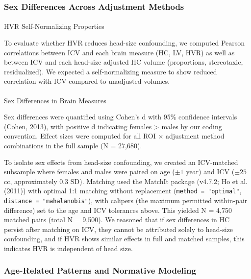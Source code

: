 \documentclass[
]{article}
\makeatletter
\let\oldparagraph\paragraph
\renewcommand{\paragraph}{
    \@ifstar
      \xxxParagraphStar
      \xxxParagraphNoStar
  }
\newcommand{\xxxParagraphStar}[1]{\oldparagraph*{#1}\mbox{}}
\newcommand{\xxxParagraphNoStar}[1]{\oldparagraph{#1}\mbox{}}
\makeatother
\begin{document}
\subsubsection{Sex Differences Across Adjustment
Methods}\label{sec-sex-diff-methods}

\paragraph{HVR Self-Normalizing
Properties}\label{hvr-self-normalizing-properties}

To evaluate whether HVR reduces head-size confounding, we computed
Pearson correlations between ICV and each brain measure (HC, LV, HVR) as
well as between ICV and each head-size adjusted HC volume (proportions,
stereotaxic, residualized). We expected a self-normalizing measure to
show reduced correlation with ICV compared to unadjusted volumes.

\paragraph{Sex Differences in Brain
Measures}\label{sex-differences-in-brain-measures}

Sex differences were quantified using Cohen's d with 95\% confidence
intervals (Cohen, 2013), with positive d indicating females
\textgreater{} males by our coding convention. Effect sizes were
computed for all ROI × adjustment method combinations in the full sample
(N = 27,680).

To isolate sex effects from head-size confounding, we created an
ICV-matched subsample where females and males were paired on age
(\(\pm 1\) year) and ICV (\(\pm 25\) cc, approximately 0.3 SD). Matching
used the MatchIt package (v4.7.2; Ho et al. (2011)) with optimal 1:1
matching without replacement (\texttt{method\ =\ "optimal"},
\texttt{distance\ =\ "mahalanobis"}), with calipers (the maximum
permitted within-pair difference) set to the age and ICV tolerances
above. This yielded N = 4,750 matched pairs (total N = 9,500). We
reasoned that if sex differences in HC persist after matching on ICV,
they cannot be attributed solely to head-size confounding, and if HVR
shows similar effects in full and matched samples, this indicates HVR is
independent of head size.

\subsubsection{Age-Related Patterns and Normative
Modeling}\label{sec-age-patterns-methods}
\end{document}
